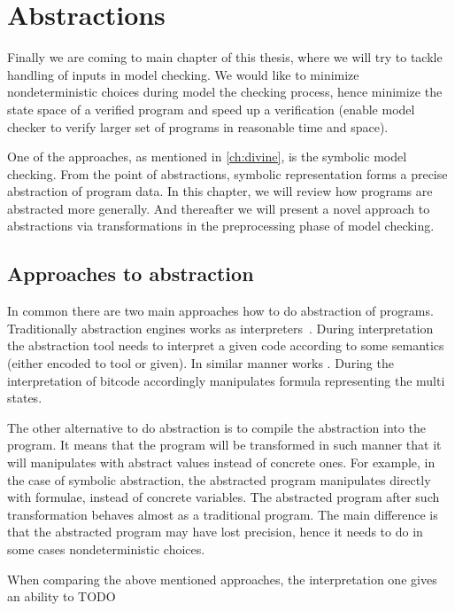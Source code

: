 \chapter{Abstractions}\label{ch:abstraction}

Finally we are coming to main chapter of this thesis, where we will try to tackle
handling of inputs in model checking. We would like to minimize nondeterministic
choices during model the checking process, hence minimize the state space of a
verified program and speed up a verification (enable model checker to verify
larger set of programs in reasonable time and space).

One of the approaches, as mentioned in \autoref{ch:divine}, is the symbolic model checking.
From the point of abstractions, symbolic representation forms a precise abstraction
of program data. In this chapter, we will review how programs are abstracted more generally.
And thereafter we will present a novel approach to abstractions via transformations
in the preprocessing phase of model checking.

\section{Approaches to abstraction}

In common there are two main approaches how to do abstraction of programs.
Traditionally abstraction engines works as interpreters~\cite{Cousot79}. During
interpretation the abstraction tool needs to interpret a given code according
to some semantics (either encoded to tool or given). In similar manner works
\SymDIVINE.  During the interpretation of \LLVM bitcode \SymDIVINE accordingly
manipulates formula representing the multi states.

The other alternative to do abstraction is to compile the abstraction into the
program. It means that the program will be transformed in such manner that it will
manipulates with abstract values instead of concrete ones. For example, in the
case of symbolic abstraction, the abstracted program manipulates directly with
formulae, instead of concrete variables. The abstracted program after such
transformation behaves almost as a traditional program. The main difference is
that the abstracted program may have lost precision, hence it needs to do
in some cases nondeterministic choices.

When comparing the above mentioned approaches, the interpretation one gives an
ability to TODO



